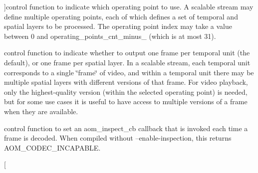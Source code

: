 \begin{Desc}
\begin{description}
{}]control function to indicate which operating point to use. A scalable stream may define multiple operating points, each of which defines a set of temporal and spatial layers to be processed. The operating point index may take a value between 0 and operating\+\_\+points\+\_\+cnt\+\_\+minus\+\_ (which is at most 31). \item[{\em 
A\+V1\+D\+\_\+\+S\+E\+T\+\_\+\+O\+U\+T\+P\+U\+T\+\_\+\+A\+L\+L\+\_\+\+L\+A\+Y\+E\+RS\hypertarget{group__aom__decoder_gga3865fd4b3192489baa9a5c3632ebe97ba8d51f96b8877b665225f5cfaa73ded8e}{}\label{group__aom__decoder_gga3865fd4b3192489baa9a5c3632ebe97ba8d51f96b8877b665225f5cfaa73ded8e}
}]control function to indicate whether to output one frame per temporal unit (the default), or one frame per spatial layer. In a scalable stream, each temporal unit corresponds to a single \char`\"{}frame\char`\"{} of video, and within a temporal unit there may be multiple spatial layers with different versions of that frame. For video playback, only the highest-\/quality version (within the selected operating point) is needed, but for some use cases it is useful to have access to multiple versions of a frame when they are available. \item[{\em 
A\+V1\+\_\+\+S\+E\+T\+\_\+\+I\+N\+S\+P\+E\+C\+T\+I\+O\+N\+\_\+\+C\+A\+L\+L\+B\+A\+CK\hypertarget{group__aom__decoder_gga3865fd4b3192489baa9a5c3632ebe97bae02fd57774db8c30e49b083fa51b6236}{}\label{group__aom__decoder_gga3865fd4b3192489baa9a5c3632ebe97bae02fd57774db8c30e49b083fa51b6236}
}]control function to set an aom\+\_\+inspect\+\_\+cb callback that is invoked each time a frame is decoded. When compiled without --enable-\/inspection, this returns A\+O\+M\+\_\+\+C\+O\+D\+E\+C\+\_\+\+I\+N\+C\+A\+P\+A\+B\+LE. \item[{\em 
}
\end{description}
\end{Desc}
